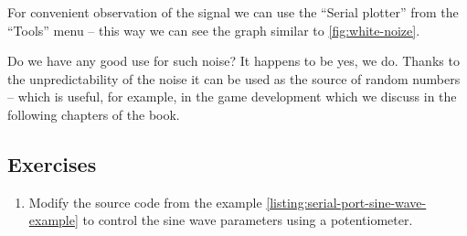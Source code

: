 \documentclass[../sparc.tex]{subfiles}
\begin{document}
For convenient observation of the signal we can use the ``Serial plotter'' from
the ``Tools'' menu -- this way we can see the graph similar to
\ref{fig:white-noize}.



Do we have any good use for such noise?  It happens to be yes, we do.  Thanks to
the unpredictability of the noise it can be used as the source of random numbers
-- which is useful, for example, in the game development which we discuss in the
following chapters of the book.

\subsection{Exercises}

\begin{enumerate}
\item Modify the source code from the example \ref{listing:serial-port-sine-wave-example}
  to control the sine wave parameters using a potentiometer.
\end{enumerate}
\end{document}
